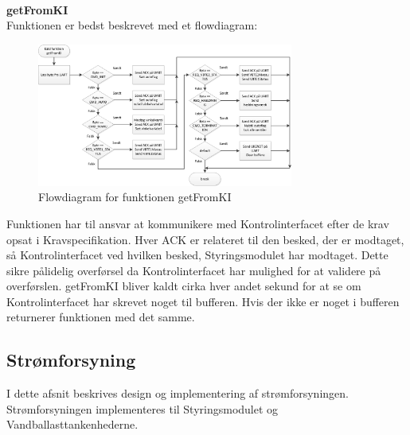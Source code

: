 \\
\textbf{getFromKI}\\
Funktionen er bedst beskrevet med et flowdiagram:
\begin{figure}[H]
	\centering
	\includegraphics[width=0.75\textwidth]{billeder/getFromKIflowchart}
	\caption{Flowdiagram for funktionen getFromKI}
	\label{fig:gFKIfc}
\end{figure}
Funktionen har til ansvar at kommunikere med Kontrolinterfacet efter de krav opsat i Kravspecifikation. Hver ACK er relateret til den besked, der er modtaget, så Kontrolinterfacet ved hvilken besked, Styringsmodulet har modtaget. Dette sikre pålidelig overførsel da Kontrolinterfacet har mulighed for at validere på overførslen. getFromKI bliver kaldt cirka hver andet sekund for at se om Kontrolinterfacet har skrevet noget til bufferen. Hvis der ikke er noget i bufferen returnerer funktionen med det samme.\\

\subsection{Strømforsyning}
I dette afsnit beskrives design og implementering af strømforsyningen. Strømforsyningen implementeres til Styringsmodulet og Vandballasttankenhederne.
